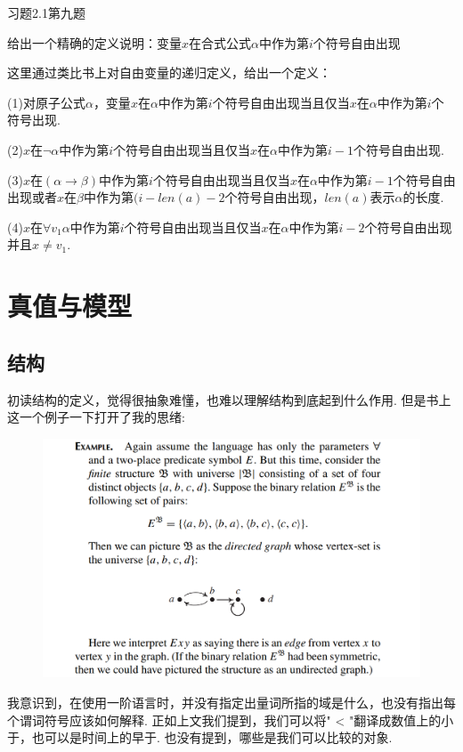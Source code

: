 习题2.1第九题

给出一个精确的定义说明：变量$x$在合式公式$\alpha$中作为第$i$个符号自由出现

这里通过类比书上对自由变量的递归定义，给出一个定义：

(1)对原子公式$\alpha$，变量$x$在$\alpha$中作为第$i$个符号自由出现当且仅当$x$在$\alpha$中作为第$i$个符号出现.

(2)$x$在$\neg \alpha$中作为第$i$个符号自由出现当且仅当$x$在$\alpha$中作为第$i - 1$个符号自由出现.

(3)$x$在$(\alpha \rightarrow \beta)$中作为第$i$个符号自由出现当且仅当$x$在$\alpha$中作为第$i - 1$个符号自由出现或者$x$在$\beta$中作为第$(i -len(a) - 2$个符号自由出现，$len(a)$表示$\alpha$的长度.

(4)$x$在$\forall v_1 \alpha$中作为第$i$个符号自由出现当且仅当$x$在$\alpha$中作为第$i - 2$个符号自由出现并且$x \neq v_1$.

\section{真值与模型}
\subsection{结构}
初读结构的定义，觉得很抽象难懂，也难以理解结构到底起到什么作用. 但是书上这一个例子一下打开了我的思绪:
\begin{figure}[H]
  \centering
  \includegraphics[width=\textwidth]{figure/1.png}
  \caption{}
  \label{}
\end{figure}

我意识到，在使用一阶语言时，并没有指定出量词所指的域是什么，也没有指出每个谓词符号应该如何解释. 正如上文我们提到，我们可以将" < "翻译成数值上的小于，也可以是时间上的早于. 也没有提到，哪些是我们可以比较的对象. 

